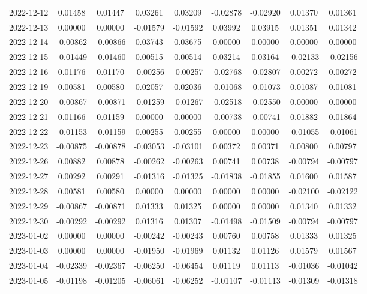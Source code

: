 \begin{footnotesize}
\begin{longtable}{lcccccccc}
2022-12-12 & 0.01458 & 0.01447 & 0.03261 & 0.03209 & -0.02878 & -0.02920 & 0.01370 & 0.01361 \\
2022-12-13 & 0.00000 & 0.00000 & -0.01579 & -0.01592 & 0.03992 & 0.03915 & 0.01351 & 0.01342 \\
2022-12-14 & -0.00862 & -0.00866 & 0.03743 & 0.03675 & 0.00000 & 0.00000 & 0.00000 & 0.00000 \\
2022-12-15 & -0.01449 & -0.01460 & 0.00515 & 0.00514 & 0.03214 & 0.03164 & -0.02133 & -0.02156 \\
2022-12-16 & 0.01176 & 0.01170 & -0.00256 & -0.00257 & -0.02768 & -0.02807 & 0.00272 & 0.00272 \\
2022-12-19 & 0.00581 & 0.00580 & 0.02057 & 0.02036 & -0.01068 & -0.01073 & 0.01087 & 0.01081 \\
2022-12-20 & -0.00867 & -0.00871 & -0.01259 & -0.01267 & -0.02518 & -0.02550 & 0.00000 & 0.00000 \\
2022-12-21 & 0.01166 & 0.01159 & 0.00000 & 0.00000 & -0.00738 & -0.00741 & 0.01882 & 0.01864 \\
2022-12-22 & -0.01153 & -0.01159 & 0.00255 & 0.00255 & 0.00000 & 0.00000 & -0.01055 & -0.01061 \\
2022-12-23 & -0.00875 & -0.00878 & -0.03053 & -0.03101 & 0.00372 & 0.00371 & 0.00800 & 0.00797 \\
2022-12-26 & 0.00882 & 0.00878 & -0.00262 & -0.00263 & 0.00741 & 0.00738 & -0.00794 & -0.00797 \\
2022-12-27 & 0.00292 & 0.00291 & -0.01316 & -0.01325 & -0.01838 & -0.01855 & 0.01600 & 0.01587 \\
2022-12-28 & 0.00581 & 0.00580 & 0.00000 & 0.00000 & 0.00000 & 0.00000 & -0.02100 & -0.02122 \\
2022-12-29 & -0.00867 & -0.00871 & 0.01333 & 0.01325 & 0.00000 & 0.00000 & 0.01340 & 0.01332 \\
2022-12-30 & -0.00292 & -0.00292 & 0.01316 & 0.01307 & -0.01498 & -0.01509 & -0.00794 & -0.00797 \\
2023-01-02 & 0.00000 & 0.00000 & -0.00242 & -0.00243 & 0.00760 & 0.00758 & 0.01333 & 0.01325 \\
2023-01-03 & 0.00000 & 0.00000 & -0.01950 & -0.01969 & 0.01132 & 0.01126 & 0.01579 & 0.01567 \\
2023-01-04 & -0.02339 & -0.02367 & -0.06250 & -0.06454 & 0.01119 & 0.01113 & -0.01036 & -0.01042 \\
2023-01-05 & -0.01198 & -0.01205 & -0.06061 & -0.06252 & -0.01107 & -0.01113 & -0.01309 & -0.01318 \\

\end{longtable}
\end{footnotesize}

